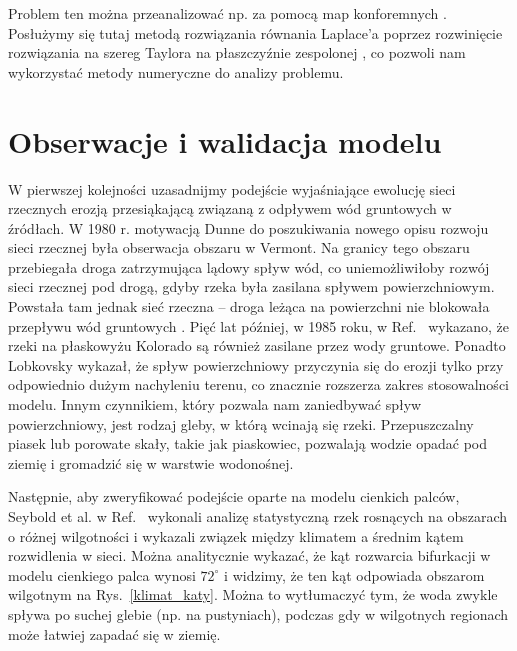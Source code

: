\documentclass[]{pracamgr}
\begin{document}
      Problem ten można przeanalizować np. za pomocą map konforemnych \cite{loewner1923untersuchungen, gubiec2008fingered}. Posłużymy się tutaj metodą rozwiązania równania Laplace'a poprzez rozwinięcie rozwiązania na szereg Taylora na płaszczyźnie zespolonej \cite{petroff2013bifurcation}, co pozwoli nam wykorzystać metody numeryczne do analizy problemu.


    \section{Obserwacje i walidacja modelu}\label{chapter:validation}

      W pierwszej kolejności uzasadnijmy podejście wyjaśniające ewolucję sieci rzecznych erozją przesiąkającą związaną z odpływem wód gruntowych w źródłach. W 1980 r. motywacją Dunne do poszukiwania nowego opisu rozwoju sieci rzecznej była obserwacja obszaru w Vermont. Na granicy tego obszaru przebiegała droga zatrzymująca lądowy spływ wód, co uniemożliwiłoby rozwój sieci rzecznej pod drogą, gdyby rzeka była zasilana spływem powierzchniowym. Powstała tam jednak sieć rzeczna – droga leżąca na powierzchni nie blokowała przepływu wód gruntowych \cite{dunne1980formation}. Pięć lat później, w 1985 roku, w Ref.~\cite{laity1985sapping} wykazano, że rzeki na płaskowyżu Kolorado są również zasilane przez wody gruntowe. Ponadto Lobkovsky \cite{lobkovsky2004threshold} wykazał, że spływ powierzchniowy przyczynia się do erozji tylko przy odpowiednio dużym nachyleniu terenu, co znacznie rozszerza zakres stosowalności modelu. Innym czynnikiem, który pozwala nam zaniedbywać spływ powierzchniowy, jest rodzaj gleby, w którą wcinają się rzeki. Przepuszczalny piasek lub porowate skały, takie jak piaskowiec, pozwalają wodzie opadać pod ziemię i gromadzić się w warstwie wodonośnej.

      Następnie, aby zweryfikować podejście oparte na modelu cienkich palców, Seybold et al. w Ref.~\cite{seybold2017climate, seybold2018branching} wykonali analizę statystyczną rzek rosnących na obszarach o różnej wilgotności i wykazali związek między klimatem a średnim kątem rozwidlenia w sieci. Można analitycznie wykazać, że kąt rozwarcia bifurkacji w modelu cienkiego palca wynosi $72^\circ$ \cite{hastings2001growth, carleson2002laplacian, gubiec2008fingered, devauchelle2012ramification} i widzimy, że ten kąt odpowiada obszarom wilgotnym na Rys.~\ref{klimat_katy}. Można to wytłumaczyć tym, że woda zwykle spływa po suchej glebie (np. na pustyniach), podczas gdy w wilgotnych regionach może łatwiej zapadać się w ziemię.
\end{document}
